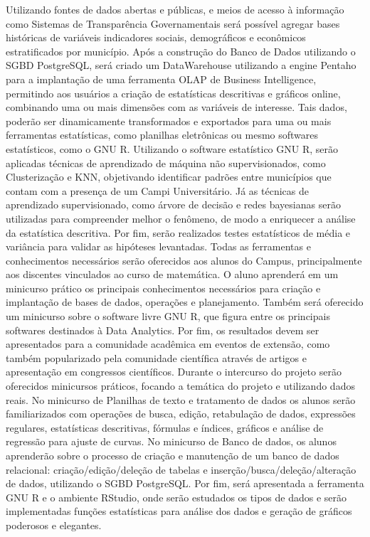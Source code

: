 \documentclass[]{article}
\begin{document}
Utilizando fontes de dados abertas e públicas, e meios de acesso à
informação como Sistemas de Transparência Governamentais será possível
agregar bases históricas de variáveis indicadores sociais, demográficos
e econômicos estratificados por município. Após a construção do Banco de
Dados utilizando o SGBD PostgreSQL, será criado um DataWarehouse
utilizando a engine Pentaho para a implantação de uma ferramenta OLAP de
Business Intelligence, permitindo aos usuários a criação de estatísticas
descritivas e gráficos online, combinando uma ou mais dimensões com as
variáveis de interesse. Tais dados, poderão ser dinamicamente
transformados e exportados para uma ou mais ferramentas estatísticas,
como planilhas eletrônicas ou mesmo softwares estatísticos, como o GNU
R. Utilizando o software estatístico GNU R, serão aplicadas técnicas de
aprendizado de máquina não supervisionados, como Clusterização e KNN,
objetivando identificar padrões entre municípios que contam com a
presença de um Campi Universitário. Já as técnicas de aprendizado
supervisionado, como árvore de decisão e redes bayesianas serão
utilizadas para compreender melhor o fenômeno, de modo a enriquecer a
análise da estatística descritiva. Por fim, serão realizados testes
estatísticos de média e variância para validar as hipóteses levantadas.
Todas as ferramentas e conhecimentos necessários serão oferecidos aos
alunos do Campus, principalmente aos discentes vinculados ao curso de
matemática. O aluno aprenderá em um minicurso prático os principais
conhecimentos necessários para criação e implantação de bases de dados,
operações e planejamento. Também será oferecido um minicurso sobre o
software livre GNU R, que figura entre os principais softwares
destinados à Data Analytics. Por fim, os resultados devem ser
apresentados para a comunidade acadêmica em eventos de extensão, como
também popularizado pela comunidade científica através de artigos e
apresentação em congressos científicos. Durante o intercurso do projeto
serão oferecidos minicursos práticos, focando a temática do projeto e
utilizando dados reais. No minicurso de Planilhas de texto e tratamento
de dados os alunos serão familiarizados com operações de busca, edição,
retabulação de dados, expressões regulares, estatísticas descritivas,
fórmulas e índices, gráficos e análise de regressão para ajuste de
curvas. No minicurso de Banco de dados, os alunos aprenderão sobre o
processo de criação e manutenção de um banco de dados relacional:
criação/edição/deleção de tabelas e inserção/busca/deleção/alteração de
dados, utilizando o SGBD PostgreSQL. Por fim, será apresentada a
ferramenta GNU R e o ambiente RStudio, onde serão estudados os tipos de
dados e serão implementadas funções estatísticas para análise dos dados
e geração de gráficos poderosos e elegantes.
\end{document}
